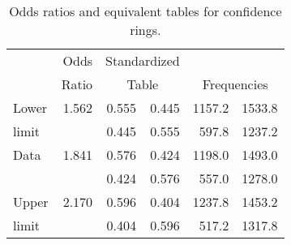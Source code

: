 \begin{table}[htb]
\caption{Odds ratios and equivalent tables for confidence rings.}\label{tab:berkodds}
 \begin{center}
\begin{tabular}{lr|rr|rr}
\hline
   &      Odds    & \multicolumn{2}{c|}{Standardized} \\
   &      Ratio   & \multicolumn{2}{c|}{Table}   &  \multicolumn{2}{c}{Frequencies} \\
\hline
Lower &   1.562   &    0.555 & 0.445   &  1157.2 &  1533.8 \\
limit &           &    0.445 & 0.555   &   597.8 &  1237.2 \\[2ex]

Data  &   1.841   &    0.576 & 0.424   &  1198.0 &  1493.0 \\
      &           &    0.424 & 0.576   &   557.0 &  1278.0 \\[2ex]

Upper &   2.170   &    0.596 & 0.404   &  1237.8 &  1453.2 \\
limit &           &    0.404 & 0.596   &   517.2 &  1317.8 \\
\hline
\end{tabular}
\end{center}
\end{table}